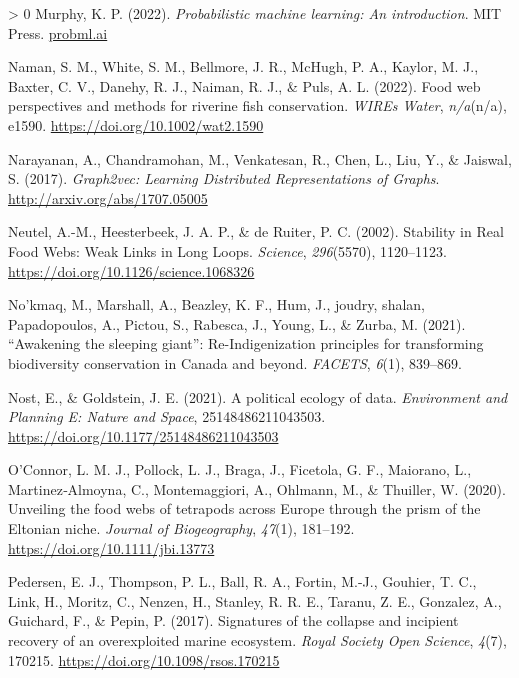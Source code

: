 \documentclass[11pt]{article}
\newlength{\cslhangindent}
\newenvironment{CSLReferences}[3] %
 {%
  \setlength{\parindent}{0pt}
  \ifodd #1 \everypar{\setlength{\hangindent}{\cslhangindent}}\ignorespaces\fi
  \ifnum #2 > 0
  \setlength{\parskip}{#2\baselineskip}
  \fi
 }%
 {}
\begin{document}
\begin{CSLReferences}{1}{0}
\leavevmode\hypertarget{ref-Murphy2022ProMac}{}%
Murphy, K. P. (2022). \emph{Probabilistic machine learning: An
introduction}. MIT Press. \href{https://probml.ai}{probml.ai}

\leavevmode\hypertarget{ref-Naman2022FooWeb}{}%
Naman, S. M., White, S. M., Bellmore, J. R., McHugh, P. A., Kaylor, M.
J., Baxter, C. V., Danehy, R. J., Naiman, R. J., \& Puls, A. L. (2022).
Food web perspectives and methods for riverine fish conservation.
\emph{WIREs Water}, \emph{n/a}(n/a), e1590.
\url{https://doi.org/10.1002/wat2.1590}

\leavevmode\hypertarget{ref-Narayanan2017GraLea}{}%
Narayanan, A., Chandramohan, M., Venkatesan, R., Chen, L., Liu, Y., \&
Jaiswal, S. (2017). \emph{Graph2vec: Learning Distributed
Representations of Graphs}. \url{http://arxiv.org/abs/1707.05005}

\leavevmode\hypertarget{ref-Neutel2002StaRea}{}%
Neutel, A.-M., Heesterbeek, J. A. P., \& de Ruiter, P. C. (2002).
Stability in Real Food Webs: Weak Links in Long Loops. \emph{Science},
\emph{296}(5570), 1120--1123.
\url{https://doi.org/10.1126/science.1068326}

\leavevmode\hypertarget{ref-Nokmaq2021AwaSle}{}%
No'kmaq, M., Marshall, A., Beazley, K. F., Hum, J., joudry, shalan,
Papadopoulos, A., Pictou, S., Rabesca, J., Young, L., \& Zurba, M.
(2021). {``Awakening the sleeping giant''}: Re-Indigenization principles
for transforming biodiversity conservation in Canada and beyond.
\emph{FACETS}, \emph{6}(1), 839--869.

\leavevmode\hypertarget{ref-Nost2021PolEco}{}%
Nost, E., \& Goldstein, J. E. (2021). A political ecology of data.
\emph{Environment and Planning E: Nature and Space}, 25148486211043503.
\url{https://doi.org/10.1177/25148486211043503}

\leavevmode\hypertarget{ref-OConnor2020UnvFoo}{}%
O'Connor, L. M. J., Pollock, L. J., Braga, J., Ficetola, G. F.,
Maiorano, L., Martinez‐Almoyna, C., Montemaggiori, A., Ohlmann, M., \&
Thuiller, W. (2020). Unveiling the food webs of tetrapods across Europe
through the prism of the Eltonian niche. \emph{Journal of Biogeography},
\emph{47}(1), 181--192. \url{https://doi.org/10.1111/jbi.13773}

\leavevmode\hypertarget{ref-Pedersen2017SigCol}{}%
Pedersen, E. J., Thompson, P. L., Ball, R. A., Fortin, M.-J., Gouhier,
T. C., Link, H., Moritz, C., Nenzen, H., Stanley, R. R. E., Taranu, Z.
E., Gonzalez, A., Guichard, F., \& Pepin, P. (2017). Signatures of the
collapse and incipient recovery of an overexploited marine ecosystem.
\emph{Royal Society Open Science}, \emph{4}(7), 170215.
\url{https://doi.org/10.1098/rsos.170215}


\end{CSLReferences}
\end{document}
